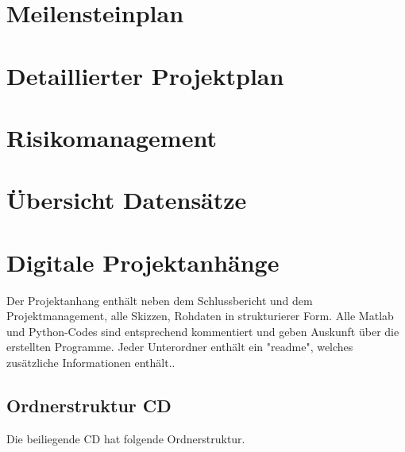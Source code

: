 \appendix

\chapter{Meilensteinplan}
\label{AnhangA}

\chapter{Detaillierter Projektplan}
\label{AnhangB}

\chapter{Risikomanagement}
\label{AnhangC}

\chapter{Übersicht Datensätze }
\label{AnhangD}


\chapter{Digitale Projektanhänge}
\label{AnhangE}

Der Projektanhang enthält neben dem Schlussbericht und dem Projektmanagement, alle Skizzen, Rohdaten in strukturierer Form. Alle Matlab und Python-Codes sind entsprechend kommentiert und geben Auskunft über die erstellten Programme. Jeder Unterordner enthält ein "readme", welches zusätzliche Informationen enthält..
\section{Ordnerstruktur CD}


Die beiliegende CD hat folgende Ordnerstruktur.

